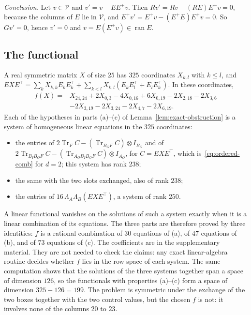 \documentclass[11pt,letterpaper]{article}
\theoremstyle{definition}\newtheorem{definition}[theorem]{Definition}
\newcommand{\Tr}{\operatorname{Tr}}
\begin{document}
\emph{Conclusion.} Let $v\in\mathcal V$ and $v'=v-EE^+v$. Then
$Rv'=Rv-(RE)E^+v=0$, because the columns of $E$ lie in $\mathcal V$,
and $E^+v'=E^+v-(E^+E)E^+v=0$. So $Gv'=0$, hence $v'=0$ and
$v=E(E^+v)\in\operatorname{ran}E$.

\subsection{The functional}\label{sec:functional-proof}

A real symmetric matrix $X$ of size $25$ has $325$ coordinates
$X_{k,l}$ with $k\le l$, and
$EXE^{\top}=\sum_kX_{k,k}E_kE_k^{\top}
+\sum_{k<l}X_{k,l}(E_kE_l^{\top}+E_lE_k^{\top})$. In these
coordinates,
\begin{align*}
 f(X)={}&X_{24,24}+2X_{0,3}-4X_{0,16}+6X_{0,19}-2X_{2,18}-2X_{3,6}\\
 &-2X_{3,19}-2X_{3,24}-2X_{4,7}-2X_{6,19}.
\end{align*}
Each of the hypotheses in parts (a)--(c) of
Lemma~\ref{lem:exact-obstruction} is a system of homogeneous linear
equations in the $325$ coordinates:
\begin{itemize}
\item[(a)] the entries of
$2\Tr_FC-(\Tr_{B_OF}C)\otimes I_{B_O}$ and of
$2\Tr_{B_IB_OF}C-(\Tr_{A_OB_IB_OF}C)\otimes I_{A_O}$, for
$C=EXE^{\top}$, which is~\eqref{eq:ordered-comb} for $d=2$; this system
has rank $238$;
\item[(b)] the same with the two slots exchanged, also of rank $238$;
\item[(c)] the entries of $16\,\Lambda_A\Lambda_B(EXE^{\top})$, a system
of rank $250$.
\end{itemize}
A linear functional vanishes on the solutions of such a system exactly
when it is a linear combination of its equations. The three parts are
therefore proved by three identities: $f$ is a rational combination of
$30$ equations of (a), of $47$ equations of (b), and of $73$ equations
of (c). The coefficients are in the supplementary material. They are
not needed to check the claims: any exact linear-algebra routine
decides whether $f$ lies in the row space of each system. The same
computation shows that the solutions of the three systems together
span a space of dimension $126$, so the functionals with
properties (a)--(c) form a space of dimension $325-126=199$. The
problem is symmetric under the exchange of the two boxes together with
the two control values, but the chosen $f$ is not: it involves none of
the columns $20$ to $23$.
\end{document}
